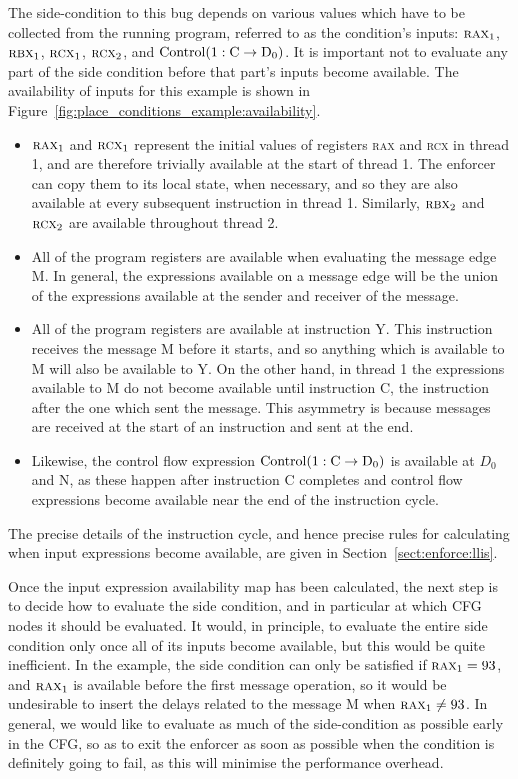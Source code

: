 The side-condition to this bug depends on various values which have to
be collected from the running program, referred to as the condition's
inputs: $\textsc{rax}_1$, $\textsc{rbx}_1$, $\textsc{rcx}_1$,
$\textsc{rcx}_2$, and $\mathrm{Control}(\mathrm{1}:\mathrm{C} \rightarrow \mathrm{D_0})$.  It is important not
to evaluate any part of the side condition before that part's inputs
become available.  The availability of inputs for this example is
shown in Figure~\ref{fig:place_conditions_example:availability}.

\begin{itemize}
\item $\textsc{rax}_1$ and $\textsc{rcx}_1$ represent the initial
  values of registers \textsc{rax} and \textsc{rcx} in thread 1, and
  are therefore trivially available at the start of thread 1.  The
  enforcer can copy them to its local state, when necessary, and so
  they are also available at every subsequent instruction in thread 1.
  Similarly, $\textsc{rbx}_2$ and $\textsc{rcx}_2$ are available
  throughout thread 2.
\item All of the program registers are available when evaluating the
  message edge M.  In general, the expressions available on a message
  edge will be the union of the expressions available at the sender and
  receiver of the message.
\item All of the program registers are available at instruction Y.
  This instruction receives the message M before it starts, and so
  anything which is available to M will also be available to Y.  On
  the other hand, in thread 1 the expressions available to M do not
  become available until instruction C, the instruction after the one
  which sent the message.  This asymmetry is because messages are
  received at the start of an instruction and sent at the end.
\item Likewise, the control flow expression $\mathrm{Control}(\mathrm{1}:\mathrm{C} \rightarrow \mathrm{D_0})$
  is available at $D_0$ and N, as these happen after instruction C
  completes and control flow expressions become available near the end
  of the instruction cycle.
\end{itemize}

The precise details of the instruction cycle, and hence precise rules
for calculating when input expressions become available, are given in
Section~\ref{sect:enforce:llis}.

Once the input expression availability map has been calculated, the
next step is to decide how to evaluate the side condition, and in
particular at which CFG nodes it should be evaluated.  It would, in
principle, to evaluate the entire side condition only once all of its
inputs become available, but this would be quite inefficient.  In the
example, the side condition can only be satisfied if $\textsc{rax}_1 =
93$, and $\textsc{rax}_1$ is available before the first message
operation, so it would be undesirable to insert the delays related to
the message M when $\textsc{rax}_1 \not= 93$.  In general, we would
like to evaluate as much of the side-condition as possible early in
the CFG, so as to exit the enforcer as soon as possible when the
condition is definitely going to fail, as this will minimise the
performance overhead.

